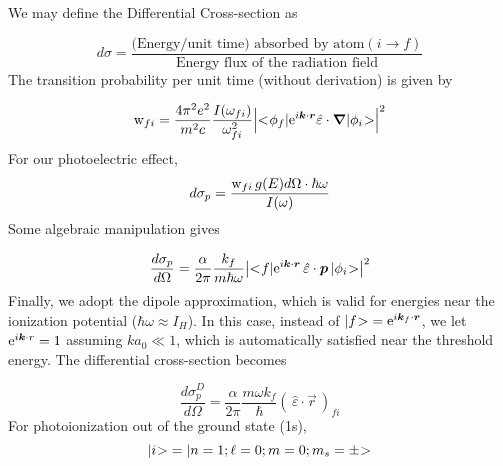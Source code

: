 \documentclass[graybox]{svmult}
\def\ket#1{{|#1\negmedspace>}}
\def\bra#1{{<\negmedspace#1|}}
\def\ltp{\left ( \,}
\def\rtp{\, \right  ) }
\def\rme{{\rm e}}
\def\rmikr{{\rm e}^{i \vec k \cdot \vec r}}
\def\eng{\varepsilon}
\newcommand{\prfi}{\ltp \hat\eng \cdot \vec r \rtp_{fi}}
\begin{document}
We may  define the Differential Cross-section as

\begin{equation}
d\sigma = \frac{ \text{(Energy/unit time) absorbed by atom} (i \to f)}{
 \text{Energy flux of the radiation field}}
\end{equation}
The	transition probability per unit time (without derivation)
is given by

\begin{equation}
	{\rm w}_{fi} = 
	\frac{4 \pi^2 e^2}{m^2 c} 
	  \frac{I(\omega_{fi})}{\omega_{fi}^2} 
	  \Big| \bra{\phi_f} \rmikr \hat\eng \cdot \vec\nabla \ket{\phi_i} \Big|^2
\end{equation}
For our photoelectric effect,
\begin{equation}
	d\sigma_p = \frac{{\rm w}_{fi} \, g(E) 
	                  d\Omega \cdot \hbar\omega}{I(\omega)}
\end{equation}
Some algebraic manipulation gives

\begin{equation}
	\frac{d\sigma_p}{d\Omega} = \frac{\alpha}{2\pi} 
	     \frac{k_f}{m\hbar\omega} 
	\big | \bra{f} \rme^{i \vec k \cdot \vec r} \, \hat\eng \cdot \vec p \,
	  \ket{\phi_i} \big|^2
\end{equation}
Finally, we adopt the dipole approximation, which is
valid for energies near the ionization potential 
($\hbar \omega \approx I_H$).
In this case,  instead of $\ket{f} = \rme^{i \vec k_f \cdot \vec r}$, 
we let $\rme^{i \vec k \cdot r} = 1$ assuming
$k a_0 \ll 1$, which is automatically satisfied near the threshold energy.
The	differential cross-section becomes

\begin{equation}
	\frac{d\sigma^D_p}{d\Omega} = \frac{\alpha}{2\pi} 
	   \frac{m\omega k_f}{\hbar}  \prfi
\end{equation}
For photoionization out of the ground state (1s),
\begin{equation}
\ket{i} = \ket{n=1; \ell=0; m=0; m_s=\pm} 
\end{equation}
\end{document}
